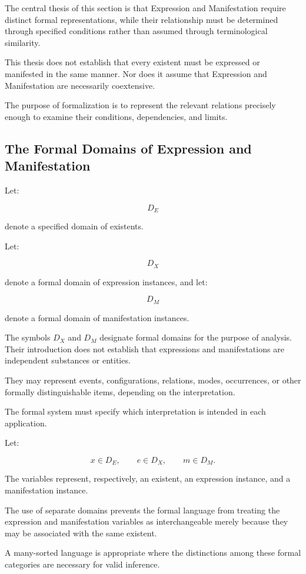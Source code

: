 The central thesis of this section is that
Expression and Manifestation require distinct
formal representations, while their relationship
must be determined through specified conditions
rather than assumed through terminological
similarity.

This thesis does not establish that every
existent must be expressed or manifested in
the same manner. Nor does it assume that
Expression and Manifestation are necessarily
coextensive.

The purpose of formalization is to represent
the relevant relations precisely enough to
examine their conditions, dependencies, and
limits.

\subsection{The Formal Domains of Expression and Manifestation}

Let:

\[
    D_E
\]

denote a specified domain of existents.

Let:

\[
    D_X
\]

denote a formal domain of expression instances,
and let:

\[
    D_M
\]

denote a formal domain of manifestation instances.

The symbols \(D_X\) and \(D_M\) designate
formal domains for the purpose of analysis.
Their introduction does not establish that
expressions and manifestations are independent
substances or entities.

They may represent events, configurations,
relations, modes, occurrences, or other
formally distinguishable items, depending
on the interpretation.

The formal system must specify which
interpretation is intended in each application.

Let:

\[
    x \in D_E,
    \qquad
    e \in D_X,
    \qquad
    m \in D_M.
\]

The variables represent, respectively,
an existent, an expression instance, and
a manifestation instance.

The use of separate domains prevents
the formal language from treating the
expression and manifestation variables
as interchangeable merely because
they may be associated with the same
existent.

A many-sorted language is appropriate
where the distinctions among these
formal categories are necessary for
valid inference.

